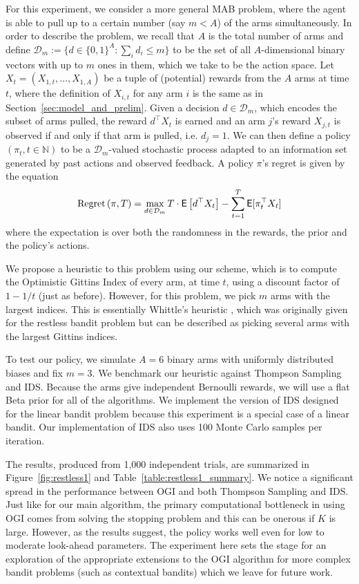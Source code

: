 For this experiment, we consider a more general MAB problem, where the agent is able to pull up to a certain number (say $m < A$) of the arms simultaneously. In order to describe the problem, we recall that $A$ is the total number of arms and define  $\mathcal{D}_m := \{d \in \{0,1\}^A : \sum_i d_i \le m\}$ to be the set of all $A$-dimensional binary vectors with up to $m$ ones in them, which we take to be the action space. Let $X_t = (X_{1,t}, \ldots, X_{1,A})$ be a tuple of (potential) rewards from the $A$ arms at time $t$, where the definition of $X_{i,t}$ for any arm $i$ is the same as in Section~\ref{sec:model_and_prelim}. Given a decision $d \in \mathcal D_m$, which encodes the subset of arms pulled, the reward $d^\top X_t$ is earned and an arm $j$'s reward $X_{j,t}$ is observed if and only if that arm is pulled, i.e. $d_{j} = 1$. We can then define a policy $(\pi_t, t \in \mathbb{N})$ to be a $\mathcal{D}_m$-valued stochastic process adapted to an information set generated by past actions and observed feedback. 
 A policy $\pi$'s regret is given by the equation 
\[
\textnormal{Regret} \left( \pi, T \right) = \max_{d \in \mathcal D_m} T \cdot \mathsf{E} \left[  d^\top  X_t \right] - \sum_{t=1}^T \mathsf{E}[\pi_t^\top X_t ]
\]
where the expectation is over both the randomness in the rewards, the prior and the policy's actions.

We propose a heuristic to this problem using our scheme, which is to compute the Optimistic Gittins Index of every arm, at time $t$, using a discount factor of $1-1/t$ (just as before). However, for this problem, we pick $m$ arms with the largest indices. This is essentially Whittle's heuristic \citep{whittle1988restless}, which was originally given for the restless bandit problem but can be described as picking several arms with the largest Gittins indices.

To test our policy, we simulate $A = 6$ binary arms with uniformly distributed biases and fix $m=3$. 
We benchmark our heuristic against Thompson Sampling and IDS. Because the arms give independent Bernoulli rewards, we will use a flat Beta prior for all of the algorithms. We implement the version of IDS designed for the linear bandit problem because this experiment is a special case of a linear bandit. Our implementation of IDS also uses 100 Monte Carlo samples per iteration.

The results, produced from 1,000 independent trials, are summarized in Figure~\ref{fig:restless1} and Table~\ref{table:restless1_summary}. We notice a significant spread in the performance between OGI and both Thompson Sampling and IDS. Just like for our main algorithm, the primary computational bottleneck in using OGI comes from solving the stopping problem and this can be onerous if $K$ is large. However, as the results suggest, the policy works well even for low to moderate look-ahead parameters. The experiment here sets the stage for an exploration of the appropriate extensions to the OGI algorithm for more complex bandit problems (such as contextual bandits) which we leave for future work. 

